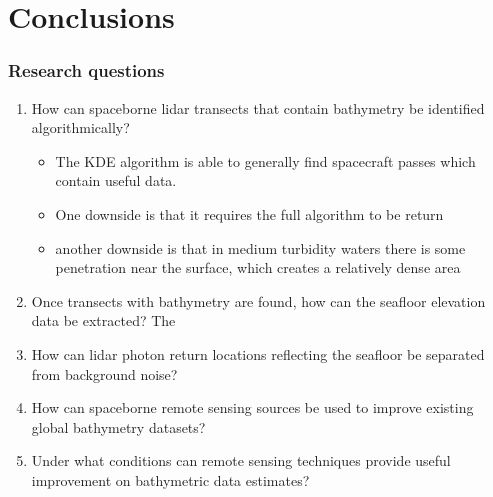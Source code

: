 \chapter{Conclusions}
\subsection{Research questions}
\begin{enumerate}
    \item How can spaceborne lidar transects that contain bathymetry be identified algorithmically?
    
    \begin{itemize}
        \item The KDE algorithm is able to generally find spacecraft passes which contain useful data.
        \item One downside is that it requires the full algorithm to be return
        \item another downside is that in medium turbidity waters there is some penetration near the surface, which creates a relatively dense area 
    \end{itemize}

    \item Once transects with bathymetry are found, how can the seafloor elevation data be extracted?
    The 
    \item How can lidar photon return locations reflecting the seafloor be separated from background noise?
    \item How can spaceborne remote sensing sources be used to improve existing global bathymetry datasets?
    \item Under what conditions can remote sensing techniques provide useful improvement on bathymetric data estimates?
\end{enumerate}